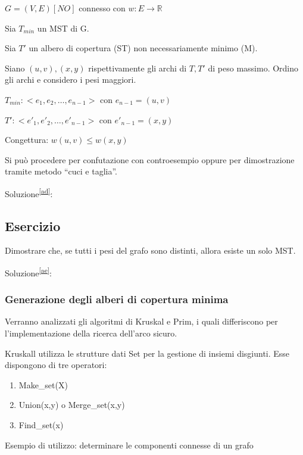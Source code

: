 $G=(V,E) [NO]$ connesso con $w:E \rightarrow \mathbb{R}$

{Sia $T_{min}$ un MST di G.}

{Sia $T'$ un albero di copertura (ST) non necessariamente minimo (M).}

{Siano $(u,v),(x,y)$ rispettivamente gli archi di $T,T'$ di peso massimo. Ordino gli archi e considero i pesi maggiori.}

$T_{min}: <e_1,e_2,\ldots,e_{n-1}>$ con $e_{n-1} = (u,v)$

$T': <e'_1,e'_2,\ldots,e'_{n-1}>$ con $e'_{n-1} = (x,y)$

{Congettura: $w(u,v) \leq w(x,y)$}

{Si può procedere per confutazione con controesempio oppure per dimostrazione tramite metodo ``cuci e taglia''.}

{Soluzione}\textsuperscript{\protect\hyperlink{cmnt30}{{[}ad{]}}}{:}

\subsection{Esercizio}

{Dimostrare che, se tutti i pesi del grafo sono distinti, allora esiste un solo MST.}

{Soluzione}\textsuperscript{\protect\hyperlink{cmnt31}{{[}ae{]}}}{:}

\subsubsection{Generazione degli alberi di copertura minima}



{Verranno analizzati gli algoritmi di Kruskal e Prim, i quali differiscono per l'implementazione della ricerca dell'arco sicuro.}

{Kruskall utilizza le strutture dati Set per la gestione di insiemi disgiunti. Esse dispongono di tre operatori:}

\begin{enumerate}
\tightlist
\item
  {Make\_set(X)}
\item
  {Union(x,y) o Merge\_set(x,y)}
\item
  {Find\_set(x)}
\end{enumerate}

{Esempio di utilizzo: determinare le componenti connesse di un grafo}



